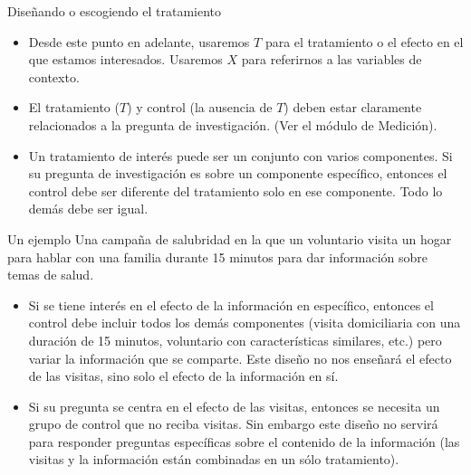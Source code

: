 \documentclass[
  ignorenonframetext,
]{beamer}
\begin{document}
\begin{frame}{Diseñando o escogiendo el tratamiento}
\protect\hypertarget{diseuxf1ando-o-escogiendo-el-tratamiento}{}
\begin{itemize}
\item
  Desde este punto en adelante, usaremos \(T\) para el tratamiento o el
  efecto en el que estamos interesados. Usaremos \(X\) para referirnos a
  las variables de contexto.
\item
  El tratamiento (\(T\)) y control (la ausencia de \(T\)) deben estar
  claramente relacionados a la pregunta de investigación. (Ver el módulo
  de Medición).
\item
  Un tratamiento de interés puede ser un conjunto con varios
  componentes. Si su pregunta de investigación es sobre un componente
  específico, entonces el control debe ser diferente del tratamiento
  solo en ese componente. Todo lo demás debe ser igual.
\end{itemize}
\end{frame}

\begin{frame}{Un ejemplo}
\protect\hypertarget{un-ejemplo}{}
Una campaña de salubridad en la que un voluntario visita un hogar para
hablar con una familia durante 15 minutos para dar información sobre
temas de salud.

\begin{itemize}
\item
  Si se tiene interés en el efecto de la información en específico,
  entonces el control debe incluir todos los demás componentes (visita
  domiciliaria con una duración de 15 minutos, voluntario con
  características similares, etc.) pero variar la información que se
  comparte. Este diseño no nos enseñará el efecto de las visitas, sino
  solo el efecto de la información en sí.
\item
  Si su pregunta se centra en el efecto de las visitas, entonces se
  necesita un grupo de control que no reciba visitas. Sin embargo este
  diseño no servirá para responder preguntas específicas sobre el
  contenido de la información (las visitas y la información están
  combinadas en un sólo tratamiento).
\end{itemize}
\end{frame}
\end{document}
